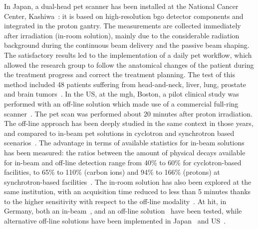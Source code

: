 In Japan, a dual-head \gls{pet} scanner has been installed at the National Cancer Center, Kashiwa~\parencite{Nishio2006}: it is based on high-resolution \gls{bgo} detector components and integrated in the proton gantry. The measurements are collected immediately after irradiation (in-room solution), mainly due to the considerable radiation background during the continuous beam delivery and the passive beam shaping. The satisfactory results led to the implementation of a daily \gls{pet} workflow, which allowed the research group to follow the anatomical changes of the patient during the treatment progress and correct the treatment planning. The test of this method included 48 patients suffering from head-and-neck, liver, lung, prostate and brain tumors~\parencite{Nishio2010}. In the US, at the \gls{mgh}, Boston, a pilot clinical study was performed with an off-line solution which made use of a commercial full-ring scanner~\parencite{Parodi2007}. The \gls{pet} scan was performed about 20 minutes after proton irradiation. The off-line approach has been deeply studied in the same context in those years, and compared to in-beam \gls{pet} solutions in cyclotron and synchrotron based scenarios~\parencite{Parodi2008, Knopf2011}. The advantage in terms of available statistics for in-beam solutions has been measured: the ratios between the amount of physical decays available for in-beam and off-line detection range from 40\% to 60\% for cyclotron-based facilities, to 65\% to 110\% (carbon ions) and 94\% to 166\% (protons) at synchrotron-based facilities~\parencite{Parodi2008}. The in-room solution has also been explored at the same institution, with an acquisition time reduced to less than 5 minutes thanks to the higher sensitivity with respect to the off-line modality~\parencite{Zhu2011}.  
At \gls{hit}, in Germany, both an in-beam~\parencite{Sommerer2009}, and an off-line solution~\parencite{Bauer2013} have been tested, while alternative off-line solutions have been implemented in Japan~\parencite{Hishikawa2002} and US~\parencite{Hsi2009}. 
